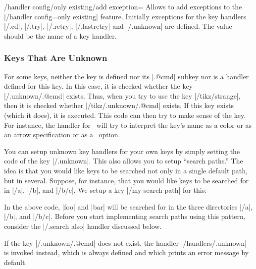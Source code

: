 \begin{key}{/handler config/only existing/add exception=} 
  Allows to add exceptions to the |/handler config=only existing|
  feature. Initially exceptions for the key handlers 
  |/.cd|, |/.try|, |/.retry|, |/.lastretry| and |/.unknown| are
  defined. The value  should be the name of a
  key handler. 
\end{key}

\subsubsection{Keys That Are Unknown}
\label{sec:pgf:unknown:keys}

For some keys, neither the key is defined nor its |.@cmd| subkey nor
is a handler defined for this key. In this case, it is checked whether
the key |/.unknown/.@cmd| exists. Thus, when you try to
use the key |/tikz/strange|, then it is checked whether
|/tikz/.unknown/.@cmd| exists. If this key exists (which it does), it is
executed. This code can then try to make sense of the key. For
instance, the handler for \tikzname\ will try to interpret the key's
name as a color or as an arrow specification or as a \pgfname\
option.

You can setup unknown key handlers for your own keys by simply setting
the code of the key \meta{my path prefix}|/.unknown|. This also allows
you to setup ``search paths.'' The idea is that you would like keys to
be searched not only in a single default path, but in
several. Suppose, for instance, that you would like keys to be
searched 
for in |/a|, |/b|, and |/b/c|. We setup a key |/my search path| for
this:
\begin{codeexample}
\end{codeexample}
In the above code, |foo| and |bar| will be searched for in the three
directories  |/a|, |/b|, and |/b/c|. Before you start implementing
search paths using this pattern, consider the |/.search also| handler
discussed below. 

If the key |/.unknown/.@cmd| does not exist, the
handler |/handlers/.unknown| is invoked instead, which is always
defined and which prints an error message by default.

